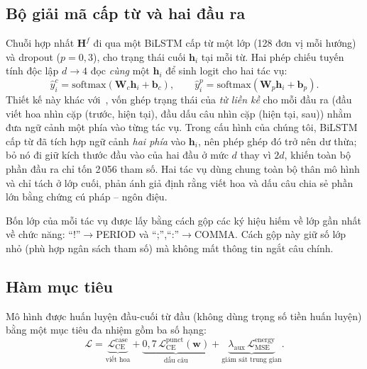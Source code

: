\documentclass[conference,onecolumn]{IEEEtran}
\begin{document}
\subsection{Bộ giải mã cấp từ và hai đầu ra}
\label{sec:decoder}
Chuỗi hợp nhất $\mathbf{H}^{f}$ đi qua một BiLSTM cấp từ một lớp (128 đơn vị mỗi
hướng) và dropout ($p=0{,}3$), cho trạng thái cuối $\mathbf{h}_i$ tại mỗi từ. Hai
phép chiếu tuyến tính độc lập $d\!\rightarrow\!4$ đọc \emph{cùng} một $\mathbf{h}_i$
để sinh logit cho hai tác vụ:
\begin{equation}
\hat{y}^{c}_i = \mathrm{softmax}(\mathbf{W}_c\mathbf{h}_i + \mathbf{b}_c),\qquad
\hat{y}^{p}_i = \mathrm{softmax}(\mathbf{W}_p\mathbf{h}_i + \mathbf{b}_p).
\end{equation}
Thiết kế này khác với~\cite{you2024lightweight}, vốn ghép trạng thái của \emph{từ
liền kề} cho mỗi đầu ra (đầu viết hoa nhìn cặp (trước, hiện tại), đầu dấu câu nhìn
cặp (hiện tại, sau)) nhằm đưa ngữ cảnh một phía vào từng tác vụ. Trong cấu hình của
chúng tôi, BiLSTM cấp từ đã tích hợp ngữ cảnh \emph{hai phía} vào $\mathbf{h}_i$,
nên phép ghép đó trở nên dư thừa; bỏ nó đi giữ kích thước đầu vào của hai đầu ở
mức $d$ thay vì $2d$, khiến toàn bộ phần đầu ra chỉ tốn 2\,056 tham số. Hai tác vụ
dùng chung toàn bộ thân mô hình và chỉ tách ở lớp cuối, phản ánh giả định rằng
viết hoa và dấu câu chia sẻ phần lớn bằng chứng cú pháp -- ngôn điệu.

Bốn lớp của mỗi tác vụ được lấy bằng cách gộp các ký hiệu hiếm về lớp gần nhất về
chức năng: ``!''$\rightarrow$PERIOD và ``;'',``:''$\rightarrow$COMMA. Cách gộp này
giữ số lớp nhỏ (phù hợp ngân sách tham số) mà không mất thông tin ngắt câu chính.

\subsection{Hàm mục tiêu}
\label{sec:objective}
Mô hình được huấn luyện đầu-cuối từ đầu (không dùng trọng số tiền huấn luyện) bằng
một mục tiêu đa nhiệm gồm ba số hạng:
\begin{equation}
\label{eq:loss}
\mathcal{L} = \underbrace{\mathcal{L}_{\mathrm{CE}}^{\mathrm{case}}}_{\text{viết hoa}}
            + \underbrace{0{,}7\,\mathcal{L}_{\mathrm{CE}}^{\mathrm{punct}}(\mathbf{w})}_{\text{dấu câu}}
            + \underbrace{\lambda_{\mathrm{aux}}\,\mathcal{L}_{\mathrm{MSE}}^{\mathrm{energy}}}_{\text{giám sát trung gian}}.
\end{equation}
\end{document}
